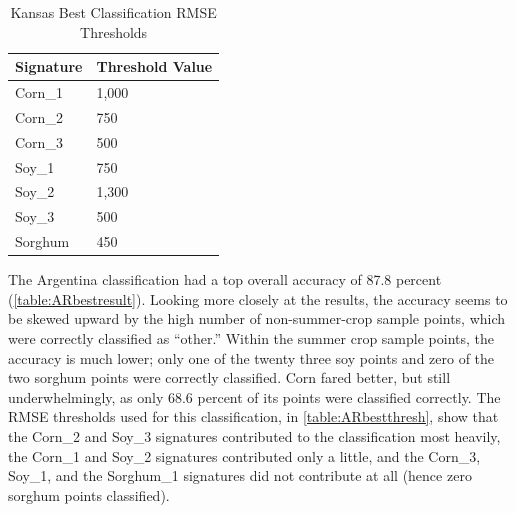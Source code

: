 \begin{table}
  \begin{Spacing}{1.0}
  \centering
  \caption{Kansas Best Classification RMSE Thresholds}
  \label{table:ksbestthresh}
  \begin{tabu} to 4in {ZZ}
    \toprule
    \textbf{Signature} & \textbf{Threshold Value} \\
    \midrule
    Corn\_1 & 1,000 \\
    Corn\_2 & 750 \\
    Corn\_3 & 500 \\
    Soy\_1 & 750 \\
    Soy\_2 & 1,300 \\
    Soy\_3 & 500 \\
    Sorghum & 450 \\
    \bottomrule
  \end{tabu}
  \end{Spacing}
\end{table}

The Argentina classification had a top overall accuracy of 87.8 percent (\autoref{table:ARbestresult}). Looking more closely at the results, the accuracy seems to be skewed upward by the high number of non-summer-crop sample points, which were correctly classified as ``other.'' Within the summer crop sample points, the accuracy is much lower; only one of the twenty three soy points and zero of the two sorghum points were correctly classified. Corn fared better, but still underwhelmingly, as only 68.6 percent of its points were classified correctly. The RMSE thresholds used for this classification, in \autoref{table:ARbestthresh}, show that the Corn\_2 and Soy\_3 signatures contributed to the classification most heavily, the Corn\_1 and Soy\_2 signatures contributed only a little, and the Corn\_3, Soy\_1, and the Sorghum\_1 signatures did not contribute at all (hence zero sorghum points classified).

